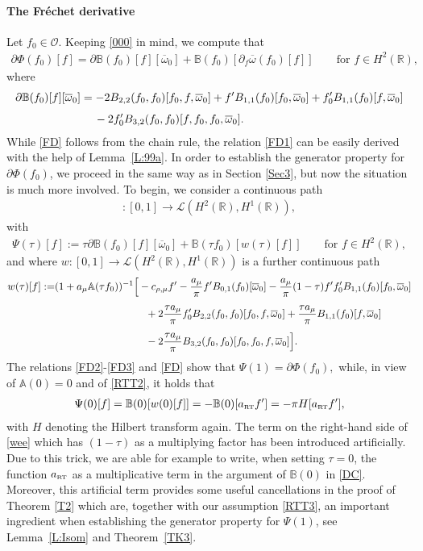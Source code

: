 \documentclass[11pt,reqno]{amsart}
\numberwithin{equation}{section}
\newcommand{\0}{\Omega}
\newcommand{\p}{\partial}
\newcommand{\ov}{\overline}
\newcommand{\oo}{\ov\omega}
\newcommand{\bA}{\mathbb{A}}
\newcommand{\bB}{\mathbb{B}}
\newcommand{\cO}{\mathcal{O}}
\newcommand{\kL}{\mathcal{L}}
\newcommand{\R}{\mathbb{R}}
\numberwithin{equation}{section}
\begin{document}
\paragraph{\bf The Fr\'echet derivative} 
Let   $f_0\in \cO$. 
Keeping \eqref{000} in mind, we compute that    
\begin{align}\label{FD}
 \p\Phi(f_0)[f]=\p\bB(f_0)[f][\oo_0]+\bB(f_0)[\p_f\oo(f_0)[f]]\qquad\text{for $f\in H^2(\R)$,}
\end{align}
where
\begin{align} 
 \p\bB(f_0)[f][\oo_0]&=-2B_{2,2}(f_0,f_0)[f_0,f,\oo_0]+f'B_{1,1}(f_0)[f_0,\oo_0]+f'_0B_{1,1}(f_0)[f,\oo_0]\nonumber\\[1ex]
 &\hspace{0.424cm}-2f_0'B_{3,2}(f_0,f_0)[f,f_0,f_0,\oo_0].\label{FD1}
\end{align}
While \eqref{FD}  follows from the chain rule, the relation  \eqref{FD1}  can be easily derived with the help of Lemma~\ref{L:99a}.
In order to establish the generator property for $\p\Phi(f_0)$, we proceed in the same way as in Section \ref{Sec3}, but now the situation is much more involved. 
To begin, we consider a continuous path
\begin{align*}
 [\tau\mapsto \Psi(\tau)]:[0,1]\to\kL(H^2(\R),H^1(\R)),
\end{align*}
with
\begin{align*}
 \Psi(\tau)[f]:=\tau\p\bB(f_0)[f][\oo_0]+\bB(\tau f_0)[w(\tau)[f]] \qquad\text{for $f\in H^2(\R)$},
\end{align*}
and where $w:[0,1]\to\kL(H^2(\R),H^1(\R))$ is a further continuous path
\begin{align}
 w(\tau)[f]:=&(1+a_\mu \bA(\tau f_0))^{-1}\Big[ -c_{\rho,\mu}f'-\frac{a_\mu}{\pi}f'B_{0,1}(f_0)[\oo_0]  -\frac{a_\mu}{\pi}(1-\tau)f'f_0'B_{1,1}(f_0)[f_0,\oo_0]\nonumber\\[1ex]
 &\hspace{3.08cm}+2\frac{\tau a_\mu}{\pi}f_0'B_{2,2}(f_0,f_0)[f_0,f,\oo_0]+\frac{\tau a_\mu}{\pi}B_{1,1}(f_0)[f,\oo_0]\nonumber\\[1ex]
 &\hspace{3.08cm}-2\frac{\tau a_\mu}{\pi}B_{3,2}(f_0,f_0)[f_0, f_0,f,\oo_0]  \Big].\label{wee}
\end{align}
 The relations \eqref{FD2}-\eqref{FD3} and \eqref{FD} show that  $\Psi(1)=\p\Phi(f_0),$ while, in view of $\bA(0)=0$ and of  \eqref{RTT2}, it holds that
 \begin{align}\label{DC}
  \Psi(0)[f]=\bB(0)[w(0)[f]]=- \bB(0)[ a_{\text{\tiny RT}}f']=- \pi H[ a_{\text{\tiny RT}}f'],
 \end{align}
 with $H$ denoting   the Hilbert transform again.
 The term on the right-hand side of \eqref{wee} which has $(1-\tau )$ as a multiplying factor has been introduced artificially. 
Due to this trick, we are able for example to write, when setting $\tau=0$, the  function $a_{\text{\tiny RT}}$ as a multiplicative term in the argument of $\bB(0)$ in \eqref{DC}.
Moreover, this artificial term  provides some useful cancellations in the proof of Theorem \ref{T2} which are, together  with our assumption  \eqref{RTT3}, 
an important ingredient  when establishing the generator property for $\Psi(1)$, see  Lemma~\ref{L:Isom} and Theorem~\ref{TK3}.
 
\end{document}
